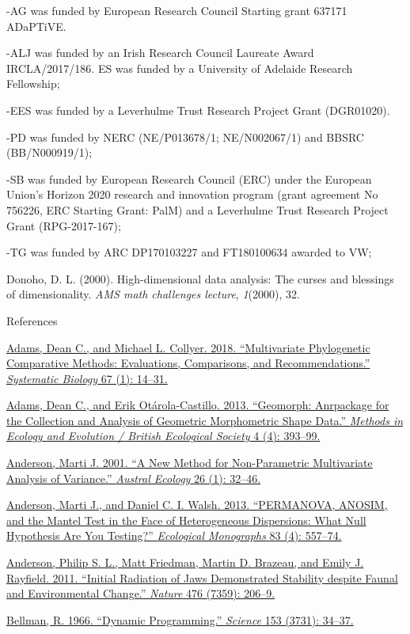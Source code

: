 -AG was funded by European Research Council Starting grant 637171
ADaPTiVE.

-ALJ was funded by an Irish Research Council Laureate Award
IRCLA/2017/186. ES was funded by a University of Adelaide Research
Fellowship;

-EES was funded by a Leverhulme Trust Research Project Grant (DGR01020).

-PD was funded by NERC (NE/P013678/1; NE/N002067/1) and BBSRC
(BB/N000919/1);

-SB was funded by European Research Council (ERC) under the European
Union's Horizon 2020 research and innovation program (grant agreement No
756226, ERC Starting Grant: PalM) and a Leverhulme Trust Research
Project Grant (RPG-2017-167);

-TG was funded by ARC DP170103227 and FT180100634 awarded to VW;

Donoho, D. L. (2000). High-dimensional data analysis: The curses and
blessings of dimensionality. \emph{AMS math challenges lecture},
\emph{1}(2000), 32.

References

\href{http://paperpile.com/b/sTGYvp/ZnDd}{Adams, Dean C., and Michael L.
Collyer. 2018. ``Multivariate Phylogenetic Comparative Methods:
Evaluations, Comparisons, and Recommendations.'' \emph{Systematic
Biology} 67 (1): 14--31.}

\href{http://paperpile.com/b/sTGYvp/J2G1}{Adams, Dean C., and Erik
Otárola-Castillo. 2013. ``Geomorph: Anrpackage for the Collection and
Analysis of Geometric Morphometric Shape Data.'' \emph{Methods in
Ecology and Evolution / British Ecological Society} 4 (4): 393--99.}

\href{http://paperpile.com/b/sTGYvp/SC6L}{Anderson, Marti J. 2001. ``A
New Method for Non-Parametric Multivariate Analysis of Variance.''
\emph{Austral Ecology} 26 (1): 32--46.}

\href{http://paperpile.com/b/sTGYvp/3hy2}{Anderson, Marti J., and Daniel
C. I. Walsh. 2013. ``PERMANOVA, ANOSIM, and the Mantel Test in the Face
of Heterogeneous Dispersions: What Null Hypothesis Are You Testing?''
\emph{Ecological Monographs} 83 (4): 557--74.}

\href{http://paperpile.com/b/sTGYvp/qjj9}{Anderson, Philip S. L., Matt
Friedman, Martin D. Brazeau, and Emily J. Rayfield. 2011. ``Initial
Radiation of Jaws Demonstrated Stability despite Faunal and
Environmental Change.'' \emph{Nature} 476 (7359): 206--9.}

\href{http://paperpile.com/b/sTGYvp/Qsl3}{Bellman, R. 1966. ``Dynamic
Programming.'' \emph{Science} 153 (3731): 34--37.}


